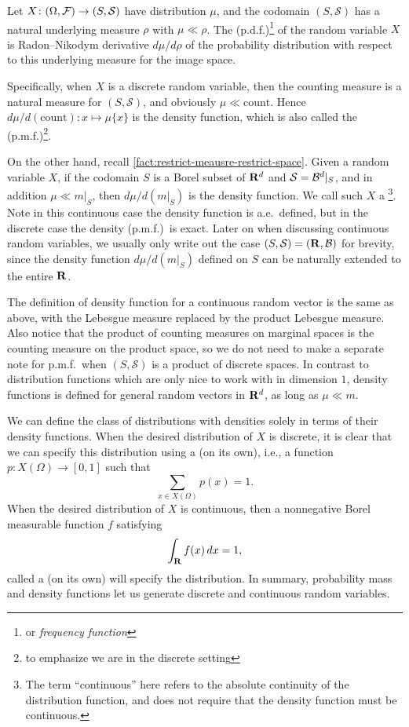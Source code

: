 Let $X\colon (\Omega,\mathcal{F})\to (S,\mathcal S)$ have distribution $\mu$, and the codomain $(S,\mathcal S)$ has a natural underlying measure $\rho$ with $\mu \ll \rho$. The  (p.d.f.)\footnote{or \emph{frequency function}} of the random variable $X$ is Radon--Nikodym derivative $d\mu/d\rho$ of the probability distribution with respect to this underlying measure for the image space.

Specifically, when $X$ is a discrete random variable, then the counting measure is a natural measure for $(S,\mathcal S)$, and obviously $\mu \ll \mathrm{count}$. Hence $d\mu/d(\mathrm{count})\colon x \mapsto \mu\{x\}$ is the density function, which is also called the  (p.m.f.)\footnote{to emphasize we are in the discrete setting}.

On the other hand, recall \cref{fact:restrict-meausre-restrict-space}. Given a random variable $X$, if the codomain $S$ is a Borel subset of $\mathbf{R}^d$ and $\mathcal S = \mathcal{B}^d|_S$, and in addition $\mu \ll m|_S$, then $d\mu/d(m|_S)$ is the density function. We call such $X$ a \footnote{The term ``continuous'' here refers to the absolute continuity of the distribution function, and does not require that the density function must be continuous.}. Note in this continuous case the density function is a.e.\ defined, but in the discrete case the density (p.m.f.)\ is exact. Later on when discussing continuous random variables, we usually only write out the case $(S,\mathcal{S}) = (\mathbf{R},\mathcal{B})$ for brevity, since the density function $d\mu / d(m|_S)$ defined on $S$ can be naturally extended to the entire $\mathbf{R}$.

The definition of density function for a continuous random vector is the same as above, with the Lebesgue measure replaced by the product Lebesgue measure. Also notice that the product of counting measures on marginal spaces is the counting measure on the product space, so we do not need to make a separate note for p.m.f.\ when $(S,\mathcal S)$ is a product of discrete spaces. In contrast to distribution functions which are only nice to work with in dimension $1$, density functions is defined for general random vectors in $\mathbf{R}^d$, as long as $\mu \ll m$.

We can define the class of distributions with densities solely in terms of their density functions. When the desired distribution of $X$ is discrete, it is clear that we can specify this distribution using a  (on its own), i.e., a function $p\colon X(\Omega) \to [0,1]$ such that \[\sum_{x\in X(\Omega)} p(x) = 1.\] When the desired distribution of $X$ is continuous, then a nonnegative Borel measurable function $f$ satisfying \[
    \int_{\mathbf{R}} f(x)\,dx = 1,
\] called a  (on its own) will specify the distribution. In summary, probability mass and density functions let us generate discrete and continuous random variables.


